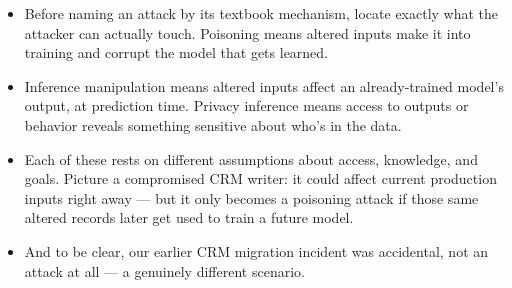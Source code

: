 \documentclass[11pt,a4paper]{article}
\begin{document}
\begin{examplebox}[title after break={SPOKEN SCRIPT --- slide 40 continued}]
\begin{itemize}
\item Before naming an attack by its textbook mechanism, locate exactly what the attacker can actually touch. Poisoning means altered inputs make it into training and corrupt the model that gets learned.
\item Inference manipulation means altered inputs affect an already-trained model's output, at prediction time. Privacy inference means access to outputs or behavior reveals something sensitive about who's in the data.
\item Each of these rests on different assumptions about access, knowledge, and goals. Picture a compromised CRM writer: it could affect current production inputs right away — but it only becomes a poisoning attack if those same altered records later get used to train a future model.
\item And to be clear, our earlier CRM migration incident was accidental, not an attack at all — a genuinely different scenario.
\end{itemize}
\end{examplebox}
\par\noindent{\scriptsize\textcolor{teal!60!black}{Reading anchor: Bass, Ch. 9–10 / §14.2 · NIST AI 100-2e2025}}
\clearpage
\end{document}
